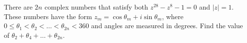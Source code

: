 There are $2n$ complex numbers that satisfy both $z^{28}-z^{8}-1=0$ and $|z|=1$. These numbers have the form $z_{m}=\cos\theta_{m}+i\sin\theta_{m}$, where $0\leq\theta_{1}<\theta_{2}< \dots <\theta_{2n}<360$ and angles are measured in degrees. Find the value of $\theta_{2}+\theta_{4}+\dots+\theta_{2n}$.